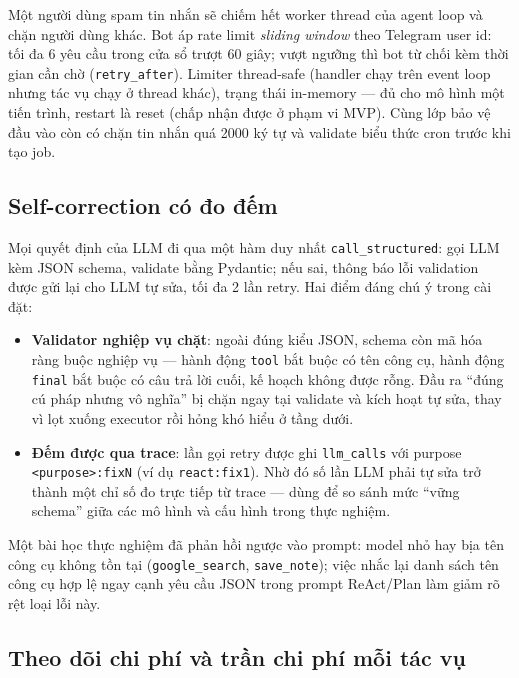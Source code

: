 Một người dùng spam tin nhắn sẽ chiếm hết worker thread của agent loop và
chặn người dùng khác. Bot áp rate limit \emph{sliding window} theo Telegram
user id: tối đa 6 yêu cầu trong cửa sổ trượt 60 giây; vượt ngưỡng thì bot từ
chối kèm thời gian cần chờ (\texttt{retry\_after}). Limiter thread-safe
(handler chạy trên event loop nhưng tác vụ chạy ở thread khác), trạng thái
in-memory --- đủ cho mô hình một tiến trình, restart là reset (chấp nhận được
ở phạm vi MVP). Cùng lớp bảo vệ đầu vào còn có chặn tin nhắn quá 2000 ký tự
và validate biểu thức cron trước khi tạo job.

\subsection{Self-correction có đo đếm}
\label{sec:ky-thuat-selfcorrect}

Mọi quyết định của LLM đi qua một hàm duy nhất \texttt{call\_structured}: gọi
LLM kèm JSON schema, validate bằng Pydantic; nếu sai, thông báo lỗi validation
được gửi lại cho LLM tự sửa, tối đa 2 lần retry. Hai điểm đáng chú ý trong
cài đặt:

\begin{itemize}
  \item \textbf{Validator nghiệp vụ chặt}: ngoài đúng kiểu JSON, schema còn mã
        hóa ràng buộc nghiệp vụ --- hành động \texttt{tool} bắt buộc có tên
        công cụ, hành động \texttt{final} bắt buộc có câu trả lời cuối, kế
        hoạch không được rỗng. Đầu ra ``đúng cú pháp nhưng vô nghĩa'' bị chặn
        ngay tại validate và kích hoạt tự sửa, thay vì lọt xuống executor rồi
        hỏng khó hiểu ở tầng dưới.
  \item \textbf{Đếm được qua trace}: lần gọi retry được ghi
        \texttt{llm\_calls} với purpose \texttt{<purpose>:fixN} (ví dụ
        \texttt{react:fix1}). Nhờ đó số lần LLM phải tự sửa trở thành một chỉ
        số đo trực tiếp từ trace --- dùng để so sánh mức ``vững schema'' giữa
        các mô hình và cấu hình trong thực nghiệm.
\end{itemize}

Một bài học thực nghiệm đã phản hồi ngược vào prompt: model nhỏ hay bịa tên
công cụ không tồn tại (\texttt{google\_search}, \texttt{save\_note}); việc
nhắc lại danh sách tên công cụ hợp lệ ngay cạnh yêu cầu JSON trong prompt
ReAct/Plan làm giảm rõ rệt loại lỗi này.

\subsection{Theo dõi chi phí và trần chi phí mỗi tác vụ}
\label{sec:ky-thuat-cost}

